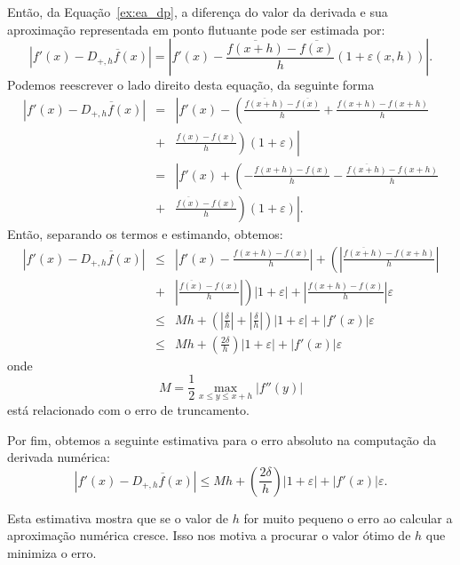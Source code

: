 Então, da Equação~\eqref{ex:ea_dp}, a diferença do valor da derivada e sua aproximação representada em ponto flutuante pode ser estimada por:
\begin{equation*}
\left|f'(x)-\overline{D_{+,h}f(x)}\right| = \left| f'(x)-\frac{\overline{f(x+h)}-\overline{f(x)}}{h}(1+\varepsilon(x,h)) \right|.
\end{equation*}
Podemos reescrever o lado direito desta equação, da seguinte forma
\begin{eqnarray*}
  \left|f'(x)-\overline{D_{+,h}f(x)}\right| &=& \left| f'(x)-\left(\frac{\overline{f(x+h)}-\overline{f(x)}}{h}+\frac{f(x+h)-f(x+h)}{h}\right.\right. \\
&+& \left.\left.\frac{f(x)-f(x)}{h}\right)(1+\varepsilon) \right|\\
&=& \left| f'(x)+\left(-\frac{f(x+h)-f(x)}{h}-\frac{\overline{f(x+h)}-f(x+h)}{h}\right.\right.\\
&+& \left.\left. \frac{\overline{f(x)}-f(x)}{h}\right)(1+\varepsilon) \right|.
\end{eqnarray*}
Então, separando os termos e estimando, obtemos:
\begin{eqnarray*}
\left|f'(x)-\overline{D_{+,h}f(x)}\right| &\leq& \left|f'(x)-\frac{f(x+h)-f(x)}{h}\right| +\left(\left|\frac{\overline{f(x+h)}-f(x+h)}{h}\right|\right.\\
&+&\left.\left|\frac{\overline{f(x)}-f(x)}{h}\right| \right)|1+\varepsilon| + \left|\frac{f(x+h)-f(x)}{h}\right|\varepsilon\\
&\leq& Mh +\left(\left|\frac{\delta}{h}\right|+\left|\frac{\delta}{h}\right| \right)|1+\varepsilon| +|f'(x)|\varepsilon\\
&\leq& Mh +\left(\frac{2\delta}{h}\right)|1+\varepsilon| +|f'(x)|\varepsilon
\end{eqnarray*}
onde
$$
M=\frac{1}{2}\max_{x\leq y\leq x+h}|f''(y)|
$$
está relacionado com o erro de truncamento.

Por fim, obtemos a seguinte estimativa para o erro absoluto na computação da derivada numérica:
\begin{equation}\label{eq:est_erro_arredondamento}
  \left|f'(x)-\overline{D_{+,h}f(x)}\right| \leq Mh +\left(\frac{2\delta}{h}\right)|1+\varepsilon| +|f'(x)|\varepsilon.
\end{equation}

Esta estimativa mostra que se o valor de $h$ for muito pequeno o erro ao calcular a aproximação numérica cresce. Isso nos motiva a procurar o valor ótimo de $h$ que minimiza o erro.

